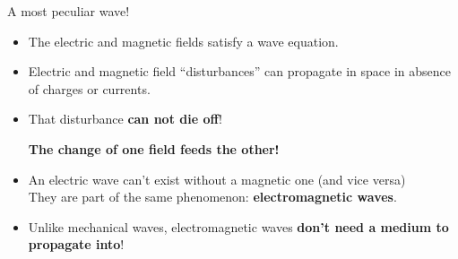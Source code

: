 \begin{frame}{A most peculiar wave!}

\begin{itemize}

   \item The electric and magnetic fields satisfy a wave equation.

   \vspace{0.2cm}

   \item Electric and magnetic field ``disturbances'' can propagate in space
             in absence of charges or currents.

   \vspace{0.2cm}

   \item That disturbance {\bf can not die off}!
             {\bf The change of one field feeds the other!}

   \vspace{0.2cm}

   \item An electric wave can't exist without a magnetic one (and vice versa)\\
             They are part of the same phenomenon: {\bf electromagnetic waves}.

   \vspace{0.2cm}

   \item Unlike mechanical waves, electromagnetic waves {\bf don't need a medium to propagate into}!

\end{itemize}

\end{frame}


%
%
%
%

